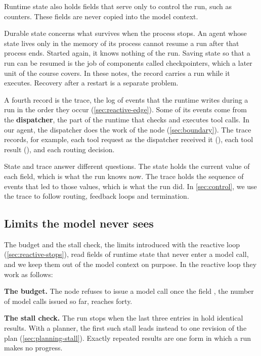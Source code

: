 Runtime state also holds fields that serve only to control the run, such as counters. These fields
are never copied into the model context.

Durable state concerns what survives when the process stops. An agent whose state lives only in the
memory of its process cannot resume a run after that process ends. Started again, it knows nothing
of the run. Saving state so that a run can be resumed is the job of components called
checkpointers, which a later unit of the course covers. In these notes, the record carries a run
while it executes. Recovery after a restart is a separate problem.

A fourth record is the trace, the log of events that the runtime writes during a run in the order
they occur (\cref{sec:reactive-edge}). Some of its events come from the \textbf{dispatcher}, the part of
the runtime that checks and executes tool calls. In our agent, the dispatcher does the work of the
 node (\cref{sec:boundary}). The trace records, for example, each tool request as the
dispatcher received it (), each tool result (), and
each routing decision.

State and trace answer different questions. The state holds the current value of each field, which
is what the run knows now. The trace holds the sequence of events that led to those values, which
is what the run did. In \cref{sec:control}, we use the trace to follow routing, feedback loops and
termination.

\subsection{Limits the model never sees}
\label{sec:state-counters}

The budget and the stall check, the limits introduced with the reactive loop
(\cref{sec:reactive-stops}), read fields of runtime state that never enter a model call, and we keep
them out of the model context on purpose. In the reactive loop they work as follows:
\bi
\item \textbf{The budget.} The  node refuses to issue a model call once the
field , the number of model calls issued so far, reaches forty.
\item \textbf{The stall check.} The run stops when the last three entries in
 hold identical results. With a planner, the first such stall leads instead
to one revision of the plan (\cref{sec:planning-stall}). Exactly repeated results are one form in
which a run makes no progress.
\ei

